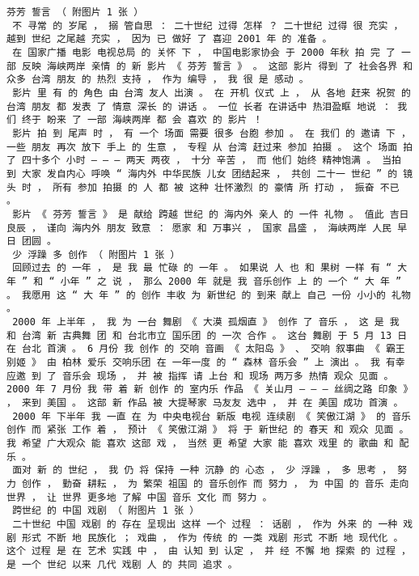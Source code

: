 \documentclass{article}
\begin{document}
\begin{Verbatim}[commandchars=\\\{\}]
 芬芳 誓言 （ 附图片 1 张 ） 
 不 寻常 的 岁尾 ， 搦 管自思 ： 二十世纪 过得 怎样 ？ 二十世纪 过得 很 充实 ， 越到 世纪 之尾越 充实 ， 因为 已 做好 了 喜迎 2001 年 的 准备 。 
 在 国家广播 电影 电视总局 的 关怀 下 ， 中国电影家协会 于 2000 年秋 拍 完 了 一部 反映 海峡两岸 亲情 的 新 影片 《 芬芳 誓言 》 。 这部 影片 得到 了 社会各界 和 众多 台湾 朋友 的 热烈 支持 ， 作为 编导 ， 我 很 是 感动 。 
 影片 里 有 的 角色 由 台湾 友人 出演 。 在 开机 仪式 上 ， 从 各地 赶来 祝贺 的 台湾 朋友 都 发表 了 情意 深长 的 讲话 。 一位 长者 在讲话中 热泪盈眶 地说 ： 我们 终于 盼来 了 一部 海峡两岸 都 会 喜欢 的 影片 ！ 
 影片 拍 到 尾声 时 ， 有 一个 场面 需要 很多 台胞 参加 。 在 我们 的 邀请 下 ， 一些 朋友 再次 放下 手上 的 生意 ， 专程 从 台湾 赶过来 参加 拍摄 。 这个 场面 拍 了 四十多个 小时 — — — 两天 两夜 ， 十分 辛苦 ， 而 他们 始终 精神饱满 。 当拍 到 大家 发自内心 呼唤 “ 海内外 中华民族 儿女 团结起来 ， 共创 二十一 世纪 ” 的 镜头 时 ， 所有 参加 拍摄 的 人 都 被 这种 壮怀激烈 的 豪情 所 打动 ， 振奋 不已 。 
 影片 《 芬芳 誓言 》 是 献给 跨越 世纪 的 海内外 亲人 的 一件 礼物 。 值此 吉日良辰 ， 谨向 海内外 朋友 致意 ： 愿家 和 万事兴 ， 国家 昌盛 ， 海峡两岸 人民 早日 团圆 。 
 少 浮躁 多 创作 （ 附图片 1 张 ） 
 回顾过去 的 一年 ， 是 我 最 忙碌 的 一年 。 如果说 人 也 和 果树 一样 有 “ 大 年 ” 和 “ 小年 ” 之 说 ， 那么 2000 年 就是 我 音乐创作 上 的 一个 “ 大 年 ” 。 我愿用 这 “ 大 年 ” 的 创作 丰收 为 新世纪 的 到来 献上 自己 一份 小小的 礼物 。 
 2000 年 上半年 ， 我 为 一台 舞剧 《 大漠 孤烟直 》 创作 了 音乐 ， 这 是 我 和 台湾 新 古典舞 团 和 台北市立 国乐团 的 一次 合作 。 这台 舞剧 于 5 月 13 日 在 台北 首演 。 6 月份 我 创作 的 交响 音画 《 太阳岛 》 、 交响 叙事曲 《 霸王别姬 》 由 柏林 爱乐 交响乐团 在 一年一度 的 “ 森林 音乐会 ” 上 演出 。 我 有幸 应邀 到 了 音乐会 现场 ， 并 被 指挥 请 上台 和 现场 两万多 热情 观众 见面 。 2000 年 7 月份 我 带 着 新 创作 的 室内乐 作品 《 关山月 — — — 丝绸之路 印象 》 ， 来到 美国 。 这部 新 作品 被 大提琴家 马友友 选中 ， 并 在 美国 成功 首演 。 
 2000 年 下半年 我 一直 在 为 中央电视台 新版 电视 连续剧 《 笑傲江湖 》 的 音乐创作 而 紧张 工作 着 ， 预计 《 笑傲江湖 》 将 于 新世纪 的 春天 和 观众 见面 。 我 希望 广大观众 能 喜欢 这部 戏 ， 当然 更 希望 大家 能 喜欢 戏里 的 歌曲 和 配乐 。 
 面对 新 的 世纪 ， 我 仍 将 保持 一种 沉静 的 心态 ， 少 浮躁 ， 多 思考 ， 努力 创作 ， 勤奋 耕耘 ， 为 繁荣 祖国 的 音乐创作 而 努力 ， 为 中国 的 音乐 走向世界 ， 让 世界 更多地 了解 中国 音乐 文化 而 努力 。 
 跨世纪 的 中国 戏剧 （ 附图片 1 张 ） 
 二十世纪 中国 戏剧 的 存在 呈现出 这样 一个 过程 ： 话剧 ， 作为 外来 的 一种 戏剧 形式 不断 地 民族化 ； 戏曲 ， 作为 传统 的 一类 戏剧 形式 不断 地 现代化 。 这个 过程 是 在 艺术 实践 中 ， 由 认知 到 认定 ， 并 经 不懈 地 探索 的 过程 ， 是 一个 世纪 以来 几代 戏剧 人 的 共同 追求 。 

\end{Verbatim}
\end{document}
